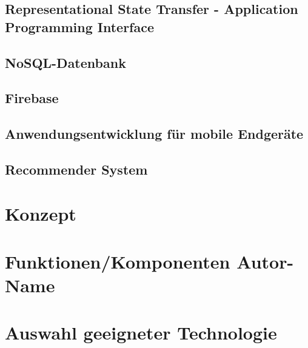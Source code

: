 \documentclass[11pt,a4paper]{article}
\begin{document}
\subsection{Representational State Transfer - Application Programming Interface}

\newpage
\subsection{NoSQL-Datenbank}

\newpage
\subsection{Firebase}


\newpage
\subsection{Anwendungsentwicklung für mobile Endgeräte}


%
\newpage

\subsection{Recommender System}


\newpage
\section{Konzept}



\section[Funktionen/Komponenten]{Funktionen/Komponenten \hfill \normalfont \small{Autor-Name}}
\newpage
\section{Auswahl geeigneter Technologie}

\end{document}
